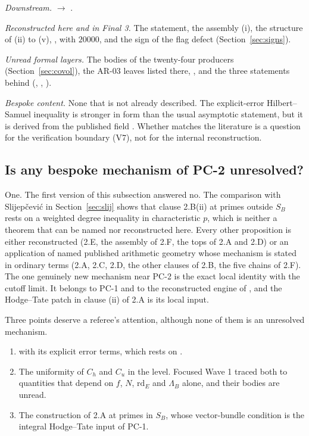 \documentclass[11pt]{article}
\theoremstyle{remark}
\begin{document}
\emph{Downstream.}  $\to$ .

\emph{Reconstructed here and in Final 3.} The statement, the assembly (i), the structure of (ii) to (v), ,  with $20000$, and the sign of the flag defect (Section~\ref{sec:signs}).

\emph{Unread formal layers.} The bodies of the twenty-four producers (Section~\ref{sec:covol}), the AR-03 leaves listed there, , and the three statements behind  (, , ).

\emph{Bespoke content.} None that is not already described. The explicit-error Hilbert--Samuel inequality  is stronger in form than the usual asymptotic statement, but it is derived from the published field . Whether  matches the literature is a question for the verification boundary (V7), not for the internal reconstruction.

\subsection*{Is any bespoke mechanism of PC-2 unresolved?}

One. The first version of this subsection answered no. The comparison with Slijepčević in Section~\ref{sec:slij} shows that clause 2.B(ii) at primes outside $S_B$ rests on a weighted degree inequality in characteristic $p$, which is neither a theorem that can be named nor reconstructed here. Every other proposition is either reconstructed (2.E, the assembly of 2.F, the tops of 2.A and 2.D) or an application of named published arithmetic geometry whose mechanism is stated in ordinary terms (2.A, 2.C, 2.D, the other clauses of 2.B, the five chains of 2.F). The one genuinely new mechanism near PC-2 is the exact local identity  with the cutoff limit. It belongs to PC-1 and to the reconstructed engine of , and the Hodge--Tate patch in clause (ii) of 2.A is its local input.

Three points deserve a referee's attention, although none of them is an unresolved mechanism.
\begin{enumerate}[nosep]
\item {} with its explicit error terms, which rests on .
\item The uniformity of $C_h$ and $C_u$ in the level. Focused Wave 1 traced both to quantities that depend on $f$, $N$, $\mathrm{rd}_E$ and $\Lambda_B$ alone, and their bodies are unread.
\item The construction of 2.A at primes in $S_B$, whose vector-bundle condition  is the integral Hodge--Tate input of PC-1.
\end{enumerate}
\end{document}
